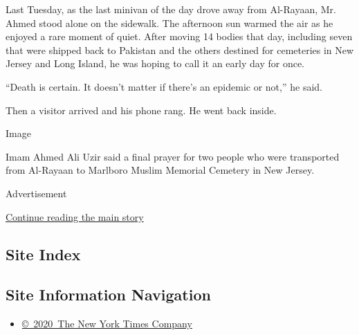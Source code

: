 Last Tuesday, as the last minivan of the day drove away from Al-Rayaan,
Mr. Ahmed stood alone on the sidewalk. The afternoon sun warmed the air
as he enjoyed a rare moment of quiet. After moving 14 bodies that day,
including seven that were shipped back to Pakistan and the others
destined for cemeteries in New Jersey and Long Island, he was hoping to
call it an early day for once.

``Death is certain. It doesn't matter if there's an epidemic or not,''
he said.

Then a visitor arrived and his phone rang. He went back inside.

Image

Imam Ahmed Ali Uzir said a final prayer for two people who were
transported from Al-Rayaan to Marlboro Muslim Memorial Cemetery in New
Jersey.

Advertisement

\protect\hyperlink{after-bottom}{Continue reading the main story}

\hypertarget{site-index}{%
\subsection{Site Index}\label{site-index}}

\hypertarget{site-information-navigation}{%
\subsection{Site Information
Navigation}\label{site-information-navigation}}

\begin{itemize}
\tightlist
\item
  \href{https://help.nytimes.com/hc/en-us/articles/115014792127-Copyright-notice}{©~2020~The
  New York Times Company}
\end{itemize}

